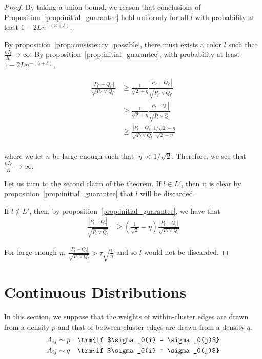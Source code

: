 \documentclass{article}
\begin{document}
\begin{proof}
By taking a union bound, we reason that conclusions of Proposition~\ref{prop:initial_guarantee} hold uniformly for all $l$ with probability at least $1 - 2L n^{-(3+\delta)}$.

By proposition~\ref{prop:consistency_possible}, there must exists a color $l$ such that $\frac{n I_l}{K} \rightarrow \infty$. By proposition~\ref{prop:initial_guarantee}, with probability at least $1 - 2 L n^{-(3 + \delta)}$, 

\begin{align*}
\frac{ |P_{l^*} - Q_{l^*}|}{\sqrt{ P_{l^*} \vee Q_{l^*}}} &\geq 
\frac{1}{\sqrt{2} + \eta} \frac{|\hat{P}_{l^*} - \hat{Q}_{l^*} | }{\sqrt{ \hat{P}_{l^*} \vee \hat{Q}_{l^*} }} \\
& \geq
\frac{1}{\sqrt{2} + \eta} \frac{|\hat{P}_l - \hat{Q}_l | }{\sqrt{ \hat{P}_l \vee \hat{Q}_l}} \\
 &\geq \frac{|P_l - Q_l|}{\sqrt{P_l \vee Q_l}} \frac{1/\sqrt{2} - \eta}{\sqrt{2} + \eta}  \\
\end{align*}

where we let $n$ be large enough such that $|\eta| < 1/\sqrt{2}$. Therefore, we see that $ \frac{n I_{l^*} }{K} \rightarrow \infty$. 

Let us turn to the second claim of the theorem. If $l \in L'$, then it is clear by proposition~\ref{prop:initial_guarantee} that $l$ will be discarded.

If $l \notin L'$, then, by proposition~\ref{prop:initial_guarantee}, we have that
\begin{align*}
\frac{|\hat{P}_l - \hat{Q}_l|}{\sqrt{\hat{P}_l \vee \hat{Q}_l}} &\geq 
   (\frac{1}{\sqrt{2}} - \eta) \frac{ | P_l - Q_l|}{\sqrt{P_l \vee Q_l}} 
\end{align*}

For large enough $n$, $\frac{|P_l - Q_l|}{\sqrt{P_l \vee Q_l}} > \tau \sqrt{ \frac{1}{n}}$ and so $l$ would not be discarded. 

\end{proof}

\section{Continuous Distributions}

In this section, we suppose that the weights of within-cluster edges are drawn from a density $p$ and that of between-cluster edges are drawn from a density $q$.
\begin{align*}
A_{ij} &\sim p  \quad \trm{if $\sigma_0(i) = \sigma_0(j)$} \\
A_{ij} &\sim q  \quad \trm{if $\sigma_0(i) = \sigma_0(j)$}
\end{align*}
\end{document}
